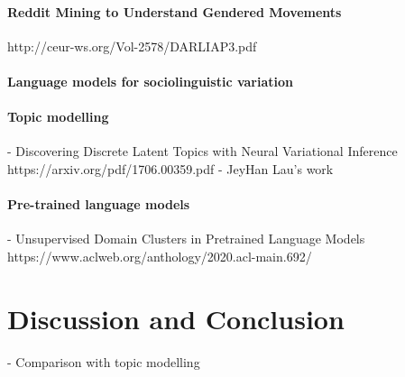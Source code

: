 \documentclass[11pt,a4paper]{article}
\begin{document}
\paragraph{Reddit Mining to Understand Gendered Movements}
http://ceur-ws.org/Vol-2578/DARLIAP3.pdf

\paragraph{Language models for sociolinguistic variation}
\cite{DelTredici2017}

\paragraph{Topic modelling}
- Discovering Discrete Latent Topics with Neural Variational Inference https://arxiv.org/pdf/1706.00359.pdf
- JeyHan Lau's work

\paragraph{Pre-trained language models}
- Unsupervised Domain Clusters in Pretrained Language Models https://www.aclweb.org/anthology/2020.acl-main.692/


\section{Discussion and Conclusion}

- Comparison with topic modelling



\end{document}

